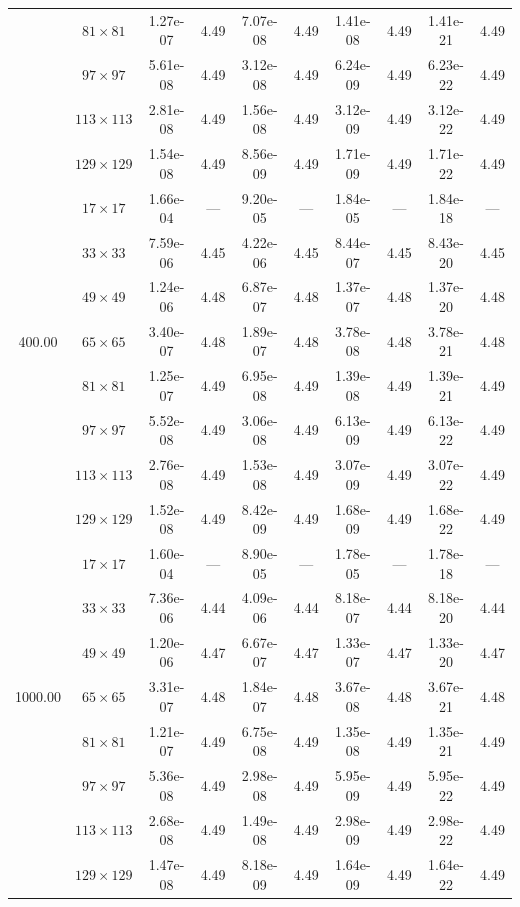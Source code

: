 \documentclass[preprint, 12pt]{elsarticle}
\begin{document}
\begin{center}
\begin{table}[H]
{\begin{tabular*}{\textwidth}{@{\extracolsep\fill}cccccccccc@{}}
    & $81\times 81$ & 1.27e-07 & 4.49 & 7.07e-08 & 4.49 & 1.41e-08 & 4.49 & 1.41e-21 & 4.49 \\
    & $97\times 97$ & 5.61e-08 & 4.49 & 3.12e-08 & 4.49 & 6.24e-09 & 4.49 & 6.23e-22 & 4.49 \\
    & $113\times 113$ & 2.81e-08 & 4.49 & 1.56e-08 & 4.49 & 3.12e-09 & 4.49 & 3.12e-22 & 4.49 \\
    & $129\times 129$ & 1.54e-08 & 4.49 & 8.56e-09 & 4.49 & 1.71e-09 & 4.49 & 1.71e-22 & 4.49 \\
    \hline\hline
    \multirow{7}{*}{400.00} & $17\times 17$ & 1.66e-04 & --- & 9.20e-05 & --- & 1.84e-05 & --- & 1.84e-18 & --- \\
    & $33\times 33$ & 7.59e-06 & 4.45 & 4.22e-06 & 4.45 & 8.44e-07 & 4.45 & 8.43e-20 & 4.45 \\
    & $49\times 49$ & 1.24e-06 & 4.48 & 6.87e-07 & 4.48 & 1.37e-07 & 4.48 & 1.37e-20 & 4.48 \\
    & $65\times 65$ & 3.40e-07 & 4.48 & 1.89e-07 & 4.48 & 3.78e-08 & 4.48 & 3.78e-21 & 4.48 \\
    & $81\times 81$ & 1.25e-07 & 4.49 & 6.95e-08 & 4.49 & 1.39e-08 & 4.49 & 1.39e-21 & 4.49 \\
    & $97\times 97$ & 5.52e-08 & 4.49 & 3.06e-08 & 4.49 & 6.13e-09 & 4.49 & 6.13e-22 & 4.49 \\
    & $113\times 113$ & 2.76e-08 & 4.49 & 1.53e-08 & 4.49 & 3.07e-09 & 4.49 & 3.07e-22 & 4.49 \\
    & $129\times 129$ & 1.52e-08 & 4.49 & 8.42e-09 & 4.49 & 1.68e-09 & 4.49 & 1.68e-22 & 4.49 \\
    \hline\hline
    \multirow{7}{*}{1000.00} & $17\times 17$ & 1.60e-04 & --- & 8.90e-05 & --- & 1.78e-05 & --- & 1.78e-18 & --- \\
    & $33\times 33$ & 7.36e-06 & 4.44 & 4.09e-06 & 4.44 & 8.18e-07 & 4.44 & 8.18e-20 & 4.44 \\
    & $49\times 49$ & 1.20e-06 & 4.47 & 6.67e-07 & 4.47 & 1.33e-07 & 4.47 & 1.33e-20 & 4.47 \\
    & $65\times 65$ & 3.31e-07 & 4.48 & 1.84e-07 & 4.48 & 3.67e-08 & 4.48 & 3.67e-21 & 4.48 \\
    & $81\times 81$ & 1.21e-07 & 4.49 & 6.75e-08 & 4.49 & 1.35e-08 & 4.49 & 1.35e-21 & 4.49 \\
    & $97\times 97$ & 5.36e-08 & 4.49 & 2.98e-08 & 4.49 & 5.95e-09 & 4.49 & 5.95e-22 & 4.49 \\
    & $113\times 113$ & 2.68e-08 & 4.49 & 1.49e-08 & 4.49 & 2.98e-09 & 4.49 & 2.98e-22 & 4.49 \\
    & $129\times 129$ & 1.47e-08 & 4.49 & 8.18e-09 & 4.49 & 1.64e-09 & 4.49 & 1.64e-22 & 4.49 \\
    \hline
    \end{tabular*}
}
\end{table}
\end{center}
\end{document}
